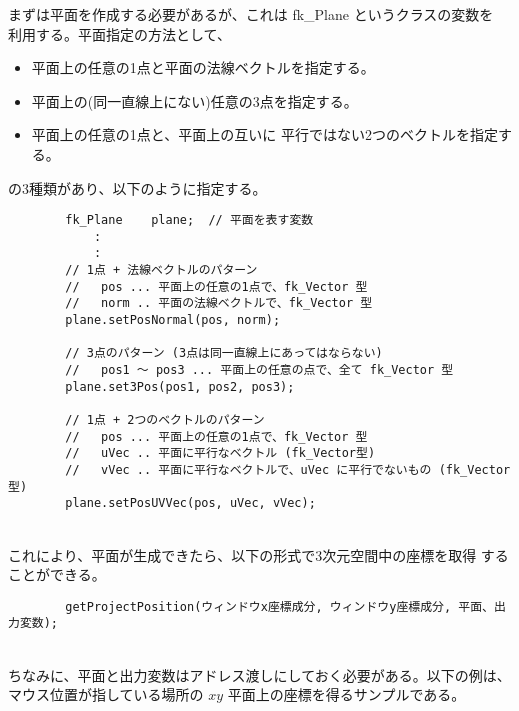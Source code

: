 まずは平面を作成する必要があるが、これは fk\_Plane というクラスの変数を
利用する。平面指定の方法として、
\begin{itemize}
 \item 平面上の任意の1点と平面の法線ベクトルを指定する。
 \item 平面上の(同一直線上にない)任意の3点を指定する。
 \item 平面上の任意の1点と、平面上の互いに
	平行ではない2つのベクトルを指定する。
\end{itemize}
の3種類があり、以下のように指定する。
\\
\begin{breakbox}
\begin{verbatim}
        fk_Plane    plane;  // 平面を表す変数
            :
            :
        // 1点 + 法線ベクトルのパターン
        //   pos ... 平面上の任意の1点で、fk_Vector 型
        //   norm .. 平面の法線ベクトルで、fk_Vector 型
        plane.setPosNormal(pos, norm);

        // 3点のパターン (3点は同一直線上にあってはならない)
        //   pos1 〜 pos3 ... 平面上の任意の点で、全て fk_Vector 型
        plane.set3Pos(pos1, pos2, pos3);

        // 1点 + 2つのベクトルのパターン
        //   pos ... 平面上の任意の1点で、fk_Vector 型
        //   uVec .. 平面に平行なベクトル (fk_Vector型)
        //   vVec .. 平面に平行なベクトルで、uVec に平行でないもの (fk_Vector 型)
        plane.setPosUVVec(pos, uVec, vVec);
\end{verbatim}
\end{breakbox}
~ \\
これにより、平面が生成できたら、以下の形式で3次元空間中の座標を取得
することができる。
\\
\begin{screen}
\begin{verbatim}
        getProjectPosition(ウィンドウx座標成分, ウィンドウy座標成分, 平面、出力変数);
\end{verbatim}
\end{screen}
~ \\
ちなみに、平面と出力変数はアドレス渡しにしておく必要がある。以下の例は、
マウス位置が指している場所の \(xy\) 平面上の座標を得るサンプルである。
\\

